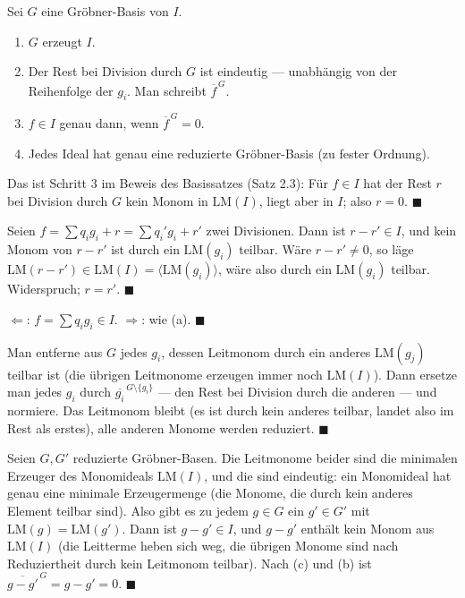 \begin{merksatz}
Sei $G$ eine Gröbner-Basis von $I$.
\begin{enumerate}[label=(\alph*), leftmargin=1.6em]
\item $G$ erzeugt $I$.
\item Der Rest bei Division durch $G$ ist eindeutig --- unabhängig von der Reihenfolge der $g_i$. Man schreibt $\overline f^{\,G}$.
\item $f\in I$ genau dann, wenn $\overline f^{\,G} = 0$.
\item Jedes Ideal hat genau eine reduzierte Gröbner-Basis (zu fester Ordnung).
\end{enumerate}

Das ist Schritt 3 im Beweis des Basissatzes (Satz 2.3): Für $f\in I$ hat der Rest $r$ bei Division durch $G$ kein Monom in $\mathrm{LM}(I)$, liegt aber in $I$; also $r = 0$. $\blacksquare$

Seien $f = \sum q_ig_i + r = \sum q_i'g_i + r'$ zwei Divisionen. Dann ist $r - r'\in I$, und kein Monom von $r - r'$ ist durch ein $\mathrm{LM}(g_i)$ teilbar. Wäre $r - r'\ne0$, so läge $\mathrm{LM}(r - r')\in\mathrm{LM}(I) = \langle\mathrm{LM}(g_i)\rangle$, wäre also durch ein $\mathrm{LM}(g_i)$ teilbar. Widerspruch; $r = r'$. $\blacksquare$

$\Leftarrow$: $f = \sum q_ig_i\in I$. $\Rightarrow$: wie (a). $\blacksquare$

Man entferne aus $G$ jedes $g_i$, dessen Leitmonom durch ein anderes $\mathrm{LM}(g_j)$ teilbar ist (die übrigen Leitmonome erzeugen immer noch $\mathrm{LM}(I)$). Dann ersetze man jedes $g_i$ durch $\overline{g_i}^{\,G\setminus\{g_i\}}$ --- den Rest bei Division durch die anderen --- und normiere. Das Leitmonom bleibt (es ist durch kein anderes teilbar, landet also im Rest als erstes), alle anderen Monome werden reduziert. $\blacksquare$

Seien $G, G'$ reduzierte Gröbner-Basen. Die Leitmonome beider sind die minimalen Erzeuger des Monomideals $\mathrm{LM}(I)$, und die sind eindeutig: ein Monomideal hat genau eine minimale Erzeugermenge (die Monome, die durch kein anderes Element teilbar sind). Also gibt es zu jedem $g\in G$ ein $g'\in G'$ mit $\mathrm{LM}(g) = \mathrm{LM}(g')$. Dann ist $g - g'\in I$, und $g - g'$ enthält kein Monom aus $\mathrm{LM}(I)$ (die Leitterme heben sich weg, die übrigen Monome sind nach Reduziertheit durch kein Leitmonom teilbar). Nach (c) und (b) ist $\overline{g - g'}^{\,G} = g - g' = 0$. $\blacksquare$


\end{merksatz}

